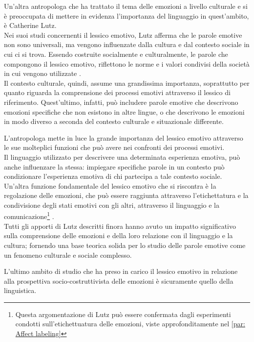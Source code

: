 Un'altra antropologa che ha trattato il tema delle emozioni a livello culturale e si è preoccupata di mettere in evidenza l'importanza del linguaggio in quest'ambito, è Catherine Lutz.\\
Nei suoi studi concernenti il lessico emotivo, Lutz afferma che le parole emotive non sono universali, ma vengono influenzate dalla cultura e dal contesto sociale in cui ci si trova. Essendo costruite socialmente e culturalmente, le parole che compongono il lessico emotivo, riflettono le norme e i valori condivisi della società in cui vengono utilizzate \parencite{lutz_politics_emotions}.\\
Il contesto culturale, quindi, assume una grandissima importanza, soprattutto per quanto riguarda la comprensione dei processi emotivi attraverso il lessico di riferimento. Quest'ultimo, infatti, può includere parole emotive che descrivono emozioni specifiche che non esistono in altre lingue, o che descrivono le emozioni in modo diverso a seconda del contesto culturale e situazionale differente.

L'antropologa mette in luce la grande importanza del lessico emotivo attraverso le sue molteplici funzioni che può avere nei confronti dei processi emotivi.\\
Il linguaggio utilizzato per descrivere una determinata esperienza emotiva, può anche influenzare la stessa: impiegare specifiche parole in un contesto può condizionare l'esperienza emotiva di chi partecipa a tale contesto sociale.\\
Un'altra funzione fondamentale del lessico emotivo che si riscontra è la regolazione delle emozioni, che può essere raggiunta attraverso l'etichettatura e la condivisione degli stati emotivi con gli altri, attraverso il linguaggio e la comunicazione\footnote{Questa argomentazione di Lutz può essere confermata dagli esperimenti condotti sull'etichettuatura delle emozioni, viste approfonditamente nel \autoref{par: Affect labeling}} \parencite{lutz_cultural_category}.\\
Tutti gli apporti di Lutz descritti finora hanno avuto un impatto significativo sulla comprensione delle emozioni e della loro relazione con il linguaggio e la cultura; fornendo una base teorica solida per lo studio delle parole emotive come un fenomeno culturale e sociale complesso.

L'ultimo ambito di studio che ha preso in carico il lessico emotivo in relazione alla prospettiva socio-costruttivista delle emozioni è sicuramente quello della linguistica. 

